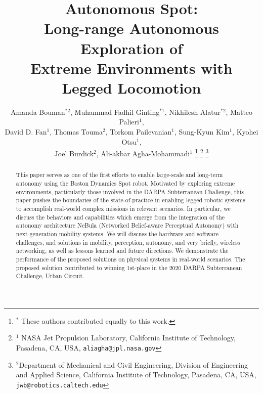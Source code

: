 \documentclass[letterpaper, 10pt, conference]{ieeeconf}      %
\title{\LARGE \bf
Autonomous Spot: \\
Long-range Autonomous Exploration of \\Extreme Environments with Legged Locomotion
}
\author{Amanda Bouman$^{*2}$, Muhammad Fadhil Ginting$^{*1}$, Nikhilesh Alatur$^{*2}$, Matteo Palieri$^{1}$, \\
David D. Fan$^{1}$, Thomas Touma$^{2}$, Torkom Pailevanian$^{1}$, Sung-Kyun Kim$^{1}$, Kyohei Otsu$^{1}$,\\
Joel Burdick$^{2}$, Ali-akbar Agha-Mohammadi$^{1}$%
\thanks{$^*$ These authors contributed equally to this work.}
\thanks{$^{1}$ NASA Jet Propulsion Laboratory, California Institute of Technology, Pasadena, CA, USA,
     {\tt\small aliagha@jpl.nasa.gov}}%
\thanks{$^{2}$Department of Mechanical and Civil Engineering, Division of Engineering and Applied Science, California Institute of Technology, Pasadena, CA, USA,
         {\tt\small jwb@robotics.caltech.edu}}%
}
\newcommand{\rev}[1]{{\color{blue}#1}} %
\begin{document}
\maketitle
\thispagestyle{empty}
\pagestyle{empty}
\begin{abstract}
This paper serves as one of the first efforts to enable large-scale and long-term autonomy using the Boston Dynamics Spot robot. Motivated by exploring extreme \rev{environments, particularly those involved in the DARPA Subterranean Challenge,} this paper pushes the boundaries of the state-of-practice in enabling legged robotic systems to accomplish real-world complex missions in relevant scenarios. 
In particular, we discuss the behaviors and capabilities which emerge from the integration of the autonomy architecture NeBula (Networked Belief-aware Perceptual Autonomy) with next-generation mobility systems.
We will discuss the hardware and software challenges, and solutions in mobility, perception, autonomy, and very briefly, wireless networking, as well as lessons learned and future directions. 
We demonstrate the performance of the proposed solutions on physical systems in real-world scenarios.
The proposed solution contributed to winning 1st-place in the 2020 DARPA Subterranean Challenge, Urban Circuit.
\end{abstract}
\end{document}
